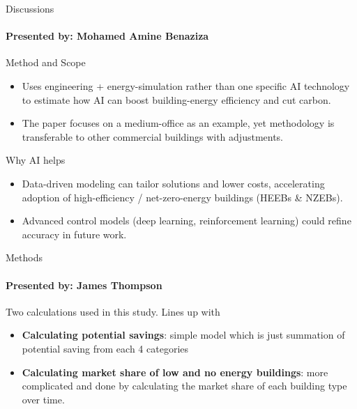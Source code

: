 \documentclass{beamer}
\begin{document}

\begin{frame}{Discussions}
\framesubtitle{Presented by: Mohamed Amine Benaziza}

Method and Scope
\begin{itemize}
    \item Uses engineering + energy-simulation rather than one specific AI technology to estimate how AI can boost building-energy efficiency and cut carbon.
    \item The paper focuses on a medium-office as an example, yet methodology is transferable to other commercial buildings with adjustments.
\end{itemize}
\pause %
Why AI helps
\begin{itemize}[<+->] %
    \item Data-driven modeling can tailor solutions and lower costs, accelerating adoption of high-efficiency / net-zero-energy buildings (HEEBs \& NZEBs).
    \item Advanced control models (deep learning, reinforcement learning) could refine accuracy in future work.
\end{itemize}

\end{frame}

\begin{frame}{Methods}
\framesubtitle{Presented by: James Thompson}

Two calculations used in this study. Lines up with 
\pause
\begin{itemize}[<+->]
    \item \textbf{Calculating potential savings}: simple model which is just summation of potential saving from each 4 categories
    \item \textbf{Calculating market share of low and no energy buildings}: more complicated and done by calculating the market share of each building type over time.
\end{itemize}
\end{frame}


\end{document}
\end{frame}
\end{document}
